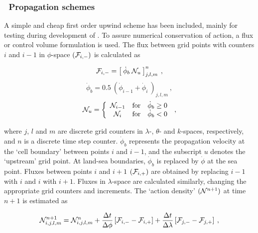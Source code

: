 \vsssub
\subsubsection{~Propagation schemes} \label{sec_xypro}
\vsssub

A simple and cheap first order upwind scheme has been included, mainly for
testing during development of \ws. To assure numerical conservation of action,
a flux or control volume formulation is used. The flux between grid points
with counters $i$ and $i-1$ in $\phi$-space $({\cal F}_{i,-})$ is calculated as


\begin{equation}
{\cal F}_{i,-} = \left [ \: \dot{\phi}_b \: {\cal N}_u \: \right ]^n_{j,l,m}
\: , \label{eq:1up_xy_1} \end{equation} \begin{equation}
\dot{\phi}_b = 0.5 \: \left ( \dot{\phi}_{i-1} + \dot{\phi}_i 
\: \right )_{j,l,m} \: , \label{eq:1up_xy_2}
\end{equation} \begin{equation}
{\cal N}_u = \left \{ \begin{array}{ccc}
{\cal N}_{i-1} & \mbox{for} & \dot{\phi}_b \geq 0 \\
{\cal N}_i     & \mbox{for} & \dot{\phi}_b   <  0
\end{array} \right . \: , \label{eq:1up_xy_3}
\end{equation}

\noindent
where $j$, $l$ and $m$ are discrete grid counters in $\lambda$-, $\theta$- and
$k$-spaces, respectively, and $n$ is a discrete time step
counter. $\dot{\phi}_b$ represents the propagation velocity at the `cell
boundary' between points $i$ and $i-1$, and the subscript $u$ denotes the
`upstream' grid point. At land-sea boundaries, $\dot{\phi}_b$ is replaced by
$\dot{\phi}$ at the sea point. Fluxes between points $i$ and $i+1$
$({\cal F}_{i,+})$ are obtained by replacing $i-1$ with $i$ and $i$ with
$i+1$. Fluxes in $\lambda$-space are calculated similarly, changing the
appropriate grid counters and increments.  The `action density' $({\cal N}^{n+1})$
at time $n+1$ is estimated as


\begin{equation}
{\cal N}_{i,j,l,m}^{n+1} = {\cal N}_{i,j,l,m}^n
  + \frac{\Delta t}{\Delta \phi   } \left [ {\cal F}_{i,-} - {\cal F}_{i,+} \right ]
  + \frac{\Delta t}{\Delta \lambda} \left [ {\cal F}_{j,-} - {\cal F}_{j,+} \right ]
\: , \label{eq:1up_xy_tot}
\end{equation}

